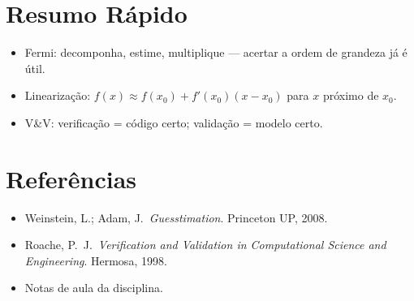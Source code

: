 \documentclass[12pt,a4paper]{article}
\begin{document}
\section*{Resumo R\'apido}
\begin{itemize}
  \item Fermi: decomponha, estime, multiplique --- acertar a ordem de grandeza j\'a \'e \'util.
  \item Lineariza\c{c}\~ao: $f(x) \approx f(x_0) + f'(x_0)(x-x_0)$ para $x$ pr\'oximo de $x_0$.
  \item V\&V: verifica\c{c}\~ao = c\'odigo certo; valida\c{c}\~ao = modelo certo.
\end{itemize}

\section*{Refer\^encias}
\begin{itemize}
  \item Weinstein, L.; Adam, J.\ \textit{Guesstimation}. Princeton UP, 2008.
  \item Roache, P.\ J.\ \textit{Verification and Validation in Computational Science and Engineering}. Hermosa, 1998.
  \item Notas de aula da disciplina.
\end{itemize}
\end{document}

